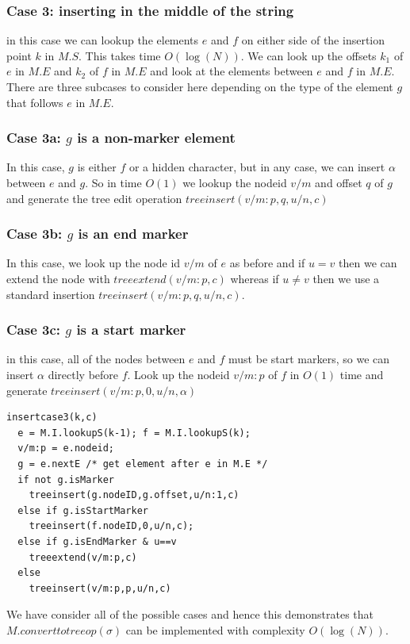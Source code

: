 \documentclass{amsart}
\begin{document}
\subsubsection{Case 3: inserting in the middle of the string}
in this case we can lookup the elements $e$ and $f$ on either side of the insertion point $k$ in $M.S$. This takes time $O(\log(N))$.  We can look up the offsets $k_1$ of $e$ in $M.E$ and $k_2$ of $f$ in $M.E$ and look at the elements between $e$ and $f$ in $M.E$. There are three subcases to consider here depending on the type of the element $g$ that follows $e$ in $M.E$.

\subsubsection{Case 3a: $g$ is a non-marker element}
In this case, $g$ is either $f$ or a hidden character, but in any case, we can insert $\alpha$ between $e$ and $g$. So in time $O(1)$ we lookup the nodeid $v/m$ and
offset $q$ of $g$ and generate the tree edit operation 
$treeinsert(v/m:p,q,u/n,c)$

\subsubsection{Case 3b: $g$ is an end marker}
In this case, we look up the node id $v/m$ of $e$ as before and if $u=v$
then we can extend the node with $treeextend(v/m:p,c)$ whereas if $u\ne v$
then we use a standard insertion $treeinsert(v/m:p,q,u/n,c)$.


\subsubsection{Case 3c: $g$ is a start marker}
in this case, all of the nodes between $e$ and $f$ must be start markers,
so we can insert $\alpha$ directly before $f$.  Look up the nodeid $v/m:p$ of $f$
in $O(1)$ time and generate $treeinsert(v/m:p,0,u/n,\alpha)$

\begin{verbatim}
insertcase3(k,c)
  e = M.I.lookupS(k-1); f = M.I.lookupS(k);
  v/m:p = e.nodeid; 
  g = e.nextE /* get element after e in M.E */
  if not g.isMarker
    treeinsert(g.nodeID,g.offset,u/n:1,c)
  else if g.isStartMarker
    treeinsert(f.nodeID,0,u/n,c);
  else if g.isEndMarker & u==v
    treeextend(v/m:p,c)
  else
    treeinsert(v/m:p,p,u/n,c)
\end{verbatim}
We have consider all of the possible cases and hence this demonstrates that 
$M.converttotreeop(\sigma)$ can be implemented with complexity $O(\log(N))$.
\end{document}
